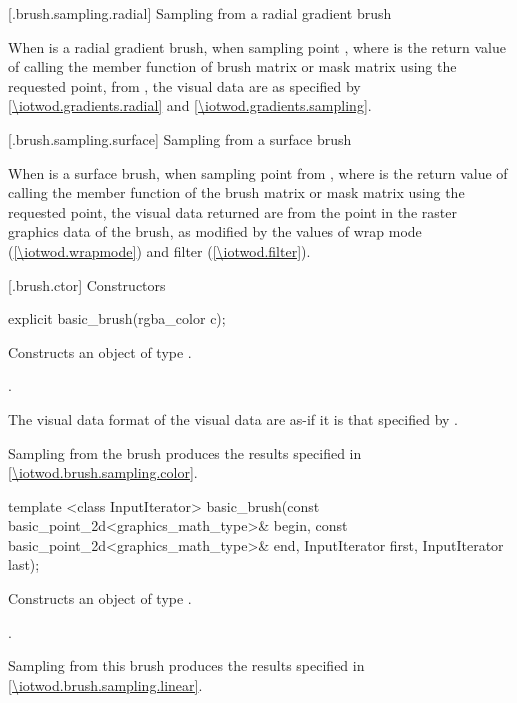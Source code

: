  [\iotwod.brush.sampling.radial] {Sampling from a radial gradient brush}

\pnum
When  is a radial gradient brush, when sampling point , where  is the return value of calling the  member function of brush matrix or mask matrix using the requested point, from , the visual data are as specified by \ref{\iotwod.gradients.radial} and \ref{\iotwod.gradients.sampling}.

 [\iotwod.brush.sampling.surface] {Sampling from a surface brush}

\pnum
When  is a surface brush, when sampling point  from , where  is the return value of calling the  member function of the brush matrix or mask matrix using the requested point, the visual data returned are from the point  in the raster graphics data of the brush, as modified by the values of wrap mode (\ref{\iotwod.wrapmode}) and filter (\ref{\iotwod.filter}).

 [\iotwod.brush.ctor] {Constructors}

%
\begin{itemdecl}
explicit basic_brush(rgba_color c);
\end{itemdecl}
\begin{itemdescr}
\pnum
\effects
Constructs an object of type .

\pnum
\postconditions
{}.

\pnum
\remarks
The visual data format of the visual data are as-if it is that specified by .

\pnum
Sampling from the brush produces the results specified in \ref{\iotwod.brush.sampling.color}.
\end{itemdescr}

%
\begin{itemdecl}
template <class InputIterator>
basic_brush(const basic_point_2d<graphics_math_type>& begin,
  const basic_point_2d<graphics_math_type>& end,
  InputIterator first, InputIterator last);
\end{itemdecl}
\begin{itemdescr}
\pnum
\effects
Constructs an object of type .

\pnum
\postconditions
{}.

\pnum
\remarks
Sampling from this brush produces the results specified in \ref{\iotwod.brush.sampling.linear}.
\end{itemdescr}

